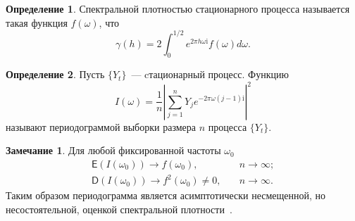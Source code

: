 \documentclass[specialist,
substylefile = spbu_report.rtx,
subf,href,colorlinks=true, 12pt]{disser}
\theoremstyle{definition}
\newtheorem{definition}{Определение}[chapter]
\newtheorem{remark}{Замечание}[chapter]
\newcommand{\im}{\mathrm{i}}
\begin{document}
\begin{definition}
	Спектральной плотностью стационарного процесса называется такая функция $f(\omega)$, что
	\[
		\gamma(h)=2\int_{0}^{1/2} e^{2\pi h\omega\im}f(\omega)d\omega.
	\]
\end{definition}
\begin{definition}
	Пусть $\{Y_t\}$~--- cтационарный процесс. Функцию
	\begin{equation}\label{eq:pgram}
		I(\omega)=\frac1n\left|\sum_{j=1}^{n} Y_je^{-2\pi \omega (j-1)\mathrm{i}}\right|^2
	\end{equation}
	называют периодограммой выборки размера $n$ процесса $\{Y_t\}$.
\end{definition}
\begin{remark}
	Для любой фиксированной частоты $\omega_0$
	\begin{align*}
		\mathsf{E}\left(I(\omega_0)\right)\to f(\omega_0),\quad       & n\to \infty; \\
		\mathsf{D}\left(I(\omega_0)\right)\to f^2(\omega_0)\ne0,\quad & n\to\infty.
	\end{align*}
	Таким образом периодограмма является асимптотически несмещенной, но несостоятельной, оценкой спектральной плотности~\cite[Раздел 4.5]{Hassler2018}.
\end{remark}
\end{document}
